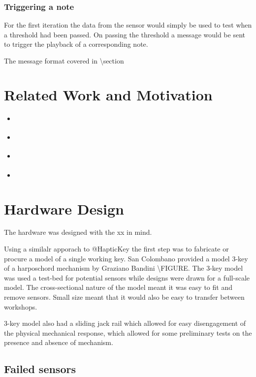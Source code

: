 \subsubsection{Triggering a note}\label{triggering-a-note}

For the first iteration the data from the sensor would simply be used to
test when a threshold had been passed. On passing the threshold a
message would be sent to trigger the playback of a corresponding note.

The message format covered in \textbackslash section

\section{Related Work and Motivation}\label{related-work-and-motivation}

\begin{itemize}
\item
  \cite{Timmermans2020}
\item
  \cite{McPherson2013} \cite{McPherson2019}
\item
  \cite{Mudd2013}
\item
  \cite{Fritz2017}
\end{itemize}

\section{Hardware Design}\label{hardware-design}

The hardware was designed with the xx in mind.

Using a similalr apporach to @HapticKey the first step was to fabricate
or procure a model of a single working key. San Colombano provided a
model 3-key of a harposchord mechanism by Graziano Bandini
\textbackslash FIGURE. The 3-key model was used a test-bed for potential
sensors while designs were drawn for a full-scale model. The
cross-sectional nature of the model meant it was easy to fit and remove
sensors. Small size meant that it would also be easy to transfer between
workshops.

3-key model also had a sliding jack rail which allowed for easy
disengagement of the physical mechanical response, which allowed for
some preliminary tests on the presence and absence of mechanism.

\subsection{Failed sensors}\label{failed-sensors}

